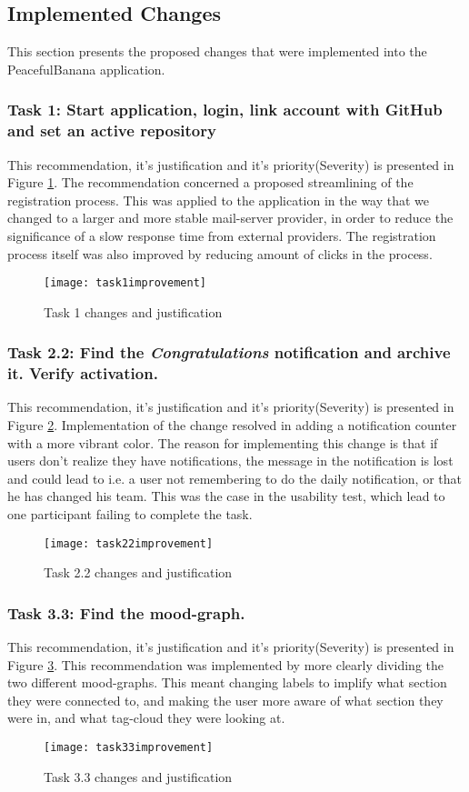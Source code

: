 \subsection*{Implemented Changes}
This section presents the proposed changes that were implemented into the PeacefulBanana application. 
\subsubsection*{Task 1: Start application, login, link account with GitHub and set an active repository}
This recommendation, it's justification and it's priority(Severity) is presented in Figure \ref{task1improvement}.
The recommendation concerned a proposed streamlining of the registration process. This was applied to the application in the way that we changed to a larger and more stable mail-server provider, in order to reduce the significance of a slow response time from external providers. The registration process itself was also improved by reducing amount of clicks in the process. 
\begin{figure}[h!]
    \centering
        \texttt{[image: task1improvement]}
    \caption{Task 1 changes and justification}
    \label{task1improvement}
\end{figure}

\subsubsection*{Task 2.2: Find the \emph{Congratulations} notification and archive it. Verify activation.}
This recommendation, it's justification and it's priority(Severity) is presented in Figure \ref{task22improvement}. 
Implementation of the change resolved in adding a notification counter with a more vibrant color. The reason for implementing this change is that if users don't realize they have notifications, the message in the notification is lost and could lead to i.e. a user not remembering to do the daily notification, or that he has changed his team. This was the case in the usability test, which lead to one participant failing to complete the task. 
\begin{figure}[H]
    \centering
        \texttt{[image: task22improvement]}
    \caption{Task 2.2 changes and justification}
    \label{task22improvement}
\end{figure}

\subsubsection*{Task 3.3: Find the mood-graph.} 
This recommendation, it's justification and it's priority(Severity) is presented in Figure \ref{task33improvement}. 
This recommendation was implemented by more clearly dividing the two different mood-graphs. This meant changing labels to implify what section they were connected to, and making the user more aware of what section they were in, and what tag-cloud they were looking at. 
\begin{figure}[h!]
    \centering
        \texttt{[image: task33improvement]}
    \caption{Task 3.3 changes and justification}
    \label{task33improvement}
\end{figure}

